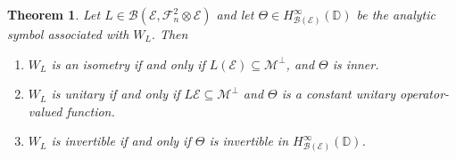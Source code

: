 \documentclass[10pt,a4paper]{amsart}
\newtheorem{theorem}{Theorem}
\def \D{\mathbb{D}}
\newcommand{\clb}{\mathcal{B}}
\newcommand{\cle}{\mathcal{E}}
\newcommand{\clf}{\mathcal{F}}
\newcommand{\clm}{\mathcal{M}}
\begin{document}
\begin{theorem}\label{thm:operator_characterization_symbol}
Let $L \in \clb(\cle,\clf_n^2\otimes \cle)$
and let $\Theta \in H^\infty_{\clb(\cle)}(\D)$
be the analytic symbol associated with  $W_L.$
Then 
\begin{enumerate}
    \item \(W_L\) is an isometry if and only if \(L(\cle)\subseteq \clm^\perp\), and \(\Theta\) is inner.

   \item \(W_L\) is unitary if and only if $L\cle\subseteq \clm^\perp$
and \(\Theta\) is a constant unitary operator-valued function.

   \item \(W_L\) is invertible if and only if \(\Theta\) is invertible in
\(H^\infty_{\clb(\cle)}(\D)\). 
 \end{enumerate}
\end{theorem}
\end{document}
